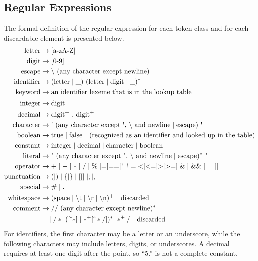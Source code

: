 \documentclass[12pt,letterpaper]{article}
\begin{document}
\subsection{Regular Expressions}
The formal definition of the regular expression for each token class and for each discardable element is presented below.
\begin{align*}
\text{letter} &\rightarrow [\text{a-zA-Z}] \\
\text{digit} &\rightarrow [0\text{-}9] \\
\text{escape} &\rightarrow \backslash\ (\text{any character except newline}) \\
\text{identifier} &\rightarrow (\text{letter} \mid \text{\_})\ (\text{letter} \mid \text{digit} \mid \text{\_})^* \\
\text{keyword} &\rightarrow \text{an identifier lexeme that is in the lookup table} \\
\text{integer} &\rightarrow \text{digit}^+ \\
\text{decimal} &\rightarrow \text{digit}^+\ .\ \text{digit}^+ \\
\text{character} &\rightarrow \text{\textquotesingle}\ (\text{any character except \textquotesingle, } \backslash \text{ and newline} \mid \text{escape})\ \text{\textquotesingle} \\
\text{boolean} &\rightarrow \text{true} \mid \text{false} \quad \text{(recognized as an identifier and looked up in the table)} \\
\text{constant} &\rightarrow \text{integer} \mid \text{decimal} \mid \text{character} \mid \text{boolean} \\
\text{literal} &\rightarrow \text{\textquotedbl}\ (\text{any character except \textquotedbl, } \backslash \text{ and newline} \mid \text{escape})^*\ \text{\textquotedbl} \\
\text{operator} &\rightarrow + \mid - \mid * \mid / \mid \% \mid = \mid == \mid ! \mid != \mid < \mid <= \mid > \mid >= \mid \& \mid \&\& \mid \text{\textbar} \mid \text{\textbar\textbar} \\
\text{punctuation} &\rightarrow ( \mid ) \mid \{ \mid \} \mid [ \mid ] \mid ; \mid , \\
\text{special} &\rightarrow \# \mid . \\
\text{whitespace} &\rightarrow (\text{space} \mid \backslash\text{t} \mid \backslash\text{r} \mid \backslash\text{n})^+ \quad \text{discarded} \\
\text{comment} &\rightarrow // \ (\text{any character except newline})^* \\
&\quad \mid /* \ ([\hat{\ }*] \mid *^+ [\hat{\ }*/])^* \ *^+ / \quad \text{discarded}
\end{align*}
\newpage
For identifiers, the first character may be a letter or an underscore, while the following characters may include letters, digits, or underscores. A decimal requires at least one digit after the point, so ``5.'' is not a complete constant.
\end{document}

